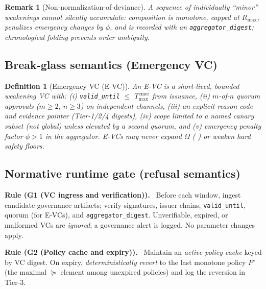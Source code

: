\documentclass[10pt]{article}
\makeatletter
\newenvironment{rulex}[1]{\begin{rulebox}\noindent\textbf{Rule (#1).}\ }{\end{rulebox}}
\newcommand{\JSGxref}[2]{%
  \@ifundefined{r@#2}{\textbf{[#1 ??]}}{#1~\ref{#2}}}
\newcommand{\secref}[1]{\JSGxref{§}{#1}}
\newtheorem{definition}{Definition}
\newtheorem{remark}{Remark}
\makeatother
\begin{document}
\begin{remark}[Non-normalization-of-deviance]
A sequence of individually “minor” weakenings cannot silently accumulate: composition is \emph{monotone}, capped at $R_{\max}$,
penalizes emergency changes by $\phi$, and is recorded with an \texttt{aggregator\_digest}; chronological folding prevents order ambiguity.
\end{remark}

\subsection*{Break-glass semantics (Emergency VC)}

\begin{definition}[Emergency VC (E-VC)]
\label{def:evc}
An E-VC is a short-lived, \emph{bounded weakening} VC with:
(i) \texttt{valid\_until} $\le$ $T_{\mathrm{max}}^{\mathrm{emer}}$ from issuance,
(ii) \emph{$m$-of-$n$} quorum approvals ($m\!\ge\!2$, $n\!\ge\!3$) on independent channels,
(iii) an explicit reason code and evidence pointer (Tier-1/2/4 digests),
(iv) \emph{scope} limited to a named canary subset (not global) unless elevated by a second quorum, and
(v) emergency penalty factor $\phi\!>\!1$ in the aggregator.
E-VCs may \emph{never} expand $\Omega$ (\secref{sec:omega-contract}) or weaken hard safety floors.
\end{definition}

\subsection*{Normative runtime gate (refusal semantics)}

\begin{rulex}{G1 (VC ingress and verification)}
Before each window, ingest candidate governance artifacts; verify signatures, issuer chains, \texttt{valid\_until},
quorum (for E-VCs), and \texttt{aggregator\_digest}. Unverifiable, expired, or malformed VCs are \emph{ignored};
a governance alert is logged. No parameter changes apply.
\end{rulex}

\begin{rulex}{G2 (Policy cache and expiry)}
Maintain an \emph{active policy cache} keyed by VC digest. On expiry, \emph{deterministically revert}
to the last monotone policy $P^\star$ (the maximal $\succeq$ element among unexpired policies) and log the reversion in Tier-3.
\end{rulex}
\end{document}
